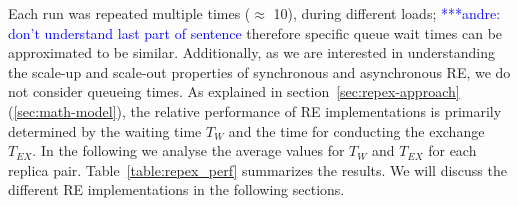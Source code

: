 \documentclass{rspublic}
\newcommand{\jhanote}[1]{ {\textcolor{red} { ***shantenu: #1 }}}
\newcommand{\alnote}[1]{ {\textcolor{blue} { ***andre: #1 }}}
\newcommand{\athotanote}[1]{ {\textcolor{green} { ***athota: #1 }}}
\newcommand{\alnote}[1]{}
\newcommand{\athotanote}[1]{}
\newcommand{\jhanote}[1]{}
\begin{document}

Each run was repeated multiple times  ($\approx$ 10), during different 
loads; \alnote{don't understand last part of sentence} therefore specific 
queue wait  times can be approximated to be similar.  Additionally, as we 
are interested in understanding the scale-up and scale-out properties
of synchronous and asynchronous RE, we do not consider queueing times.
As explained in section~\ref{sec:repex-approach} (\ref{sec:math-model}),
the relative performance of RE implementations is primarily determined
by the waiting time $T_W$ and the time for conducting the exchange
$T_{EX}$. In the following we analyse the average values for $T_{W}$ and
$T_{EX}$ for each replica pair.  Table~\ref{table:repex_perf} summarizes
the results. We will discuss the different RE implementations in the following sections.



\end{document}
